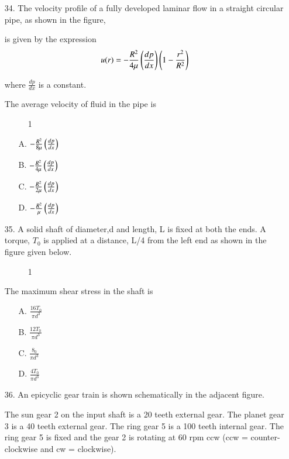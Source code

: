 \documentclass[journal]{IEEEtran}
\begin{document}
\begin{enumerate}
   
\item[34.] The velocity profile of a fully developed laminar flow in a straight circular pipe, as shown in the figure,

is given by the expression
$$ u(r) = -\frac{R^2}{4 \mu} \left(\frac{dp}{dx}\right)\left(1 - \frac{r^2}{R^2}\right)$$

where $\frac{dp}{dx}$ is a constant.
 
The average velocity of fluid in the pipe is

\begin{figure}[!ht]
    \centering
    \caption{ 1}
    \label{fig:velocity profile}
    \end{figure}

\begin{enumerate}
    \item [A.] $-\frac{R^2}{8 \mu} \left(\frac{dp}{dx}\right)$
    \item [B.] $-\frac{R^2}{4 \mu} \left(\frac{dp}{dx}\right)$
    \item [C.] $-\frac{R^2}{2 \mu} \left(\frac{dp}{dx}\right)$
    \item [D.] $-\frac{R^2}{ \mu} \left(\frac{dp}{dx}\right)$
  \end{enumerate}
\item[35.] A solid shaft of diameter,d and length, L is fixed at both the ends. A torque, $T_0$ is applied at a distance, L/4 from the left end as shown in the figure given below.

\begin{figure}[!ht]
    \centering
    \caption{ 1}
    \label{fig:shaft}
    \end{figure}

The maximum shear stress in the shaft is 
\begin{enumerate}
    \item [A.] $\frac{16T_0}{\pi d^3}$
    \item [B.] $\frac{12T_0}{\pi d^3}$
    \item [C.] $\frac{8_0}{\pi d^3}$
    \item [D.] $\frac{4T_0}{\pi d^3}$
  \end{enumerate}
\item[36.] An epicyclic gear train is shown schematically in the adjacent figure.

The sun gear 2 on the input shaft is a 20 teeth external gear. The planet gear 3 is a 40 teeth external gear. The ring gear 5 is a 100 teeth internal gear. The ring gear 5 is fixed and the gear 2 is rotating at 60 rpm ccw (ccw = counter-clockwise and cw = clockwise).


\end{enumerate}
\end{document}
